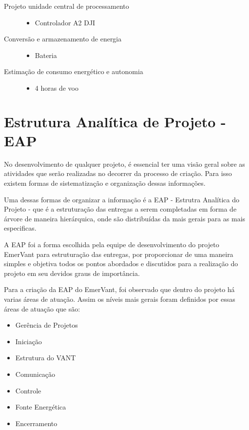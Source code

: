 \begin{description}
  \item[Projeto unidade central de processamento] \hfill 
  	\begin{itemize}
  		\item Controlador A2 DJI
  	\end{itemize}
  \item[Conversão e armazenamento de energia] \hfill 
  	\begin{itemize}
  		\item Bateria
  	\end{itemize}
  \item[Estimação de consumo energético e autonomia] \hfill 
  	\begin{itemize}
  		\item 4 horas de voo
  	\end{itemize}
\end{description}

\section{Estrutura Analítica de Projeto - EAP}

No desenvolvimento de qualquer projeto, é essencial ter uma visão geral sobre as atividades que serão realizadas no decorrer da processo de criação.  Para isso existem formas de sistematização e organização dessas informações.

Uma dessas formas de organizar a informação é a EAP - Estrutra Analítica do Projeto - que é a estruturação das entregas a serem completadas em forma de árvore de maneira hierárquica, onde são distribuídas da mais gerais para as mais especificas.

A EAP foi a forma escolhida pela equipe de desenvolvimento do projeto EmerVant para estruturação das entregas, por proporcionar de uma maneira simples e objetiva todos os pontos abordados e discutidos para a realização do projeto em seu devidos graus de importância. 

Para a criação da EAP do EmerVant, foi observado que dentro do projeto há varias áreas de atuação. Assim os níveis mais gerais foram definidos por essas áreas de atuação que são:
\begin{itemize}
\item Gerência de Projetos
\item Iniciação
\item Estrutura do VANT
\item Comunicação
\item Controle
\item Fonte Energética
\item Encerramento
\end{itemize}

